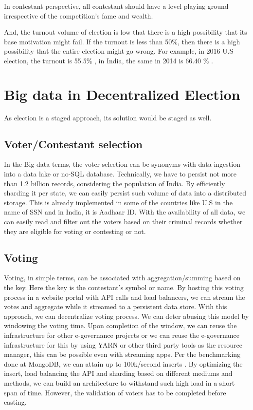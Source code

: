 \documentclass[sigconf]{acmart}
\begin{document}
In contestant perspective, all contestant should have a level playing ground irrespective of the competition's fame and wealth.

And, the turnout volume of election is low that there is a high possibility that its base motivation might fail. If the turnout is less than 50\%, then there is a high possibility that the entire election might go wrong. For example, in 2016 U.S election, the turnout is 55.5\% \cite{10:article}, in India, the same in 2014 is 66.40 \% \cite{11:online}.



\section{Big data in Decentralized Election}
As election is a staged approach, its solution would be staged as well.

\subsection{Voter/Contestant selection}

In the Big data terms, the voter selection can be synonyms with data ingestion into a data lake or no-SQL database. Technically, we have to persist not more than 1.2 billion records, considering the population of India. By efficiently sharding it per state, we can easily persist such volume of data into a distributed storage. This is already implemented in some of the countries like U.S in the name of SSN \cite{15:online} and in India, it is  Aadhaar ID\cite{13:online}. With the availability of all data, we can easily read and filter out the voters based on their criminal records whether they are eligible for voting or contesting or not.


\subsection{Voting}

Voting, in simple terms, can be associated with aggregation/summing based on the key. Here the key is the contestant's symbol or name. By hosting this voting process in a website portal with API calls and load balancers, we can stream the votes and aggregate while it streamed to a persistent data store. With this approach, we can decentralize voting process. We can deter abusing this model by windowing the voting time. Upon completion of the window, we can reuse the infrastructure for other e-governance projects or we can reuse the e-governance infrastructure for this by using YARN or other third party tools as the resource manager, this can be possible even with streaming apps. 
Per the benchmarking done at MongoDB, we can attain up to 100k/second inserts \cite{14:techreport}. By optimizing the insert, load balancing the API  and sharding based on different mediums and methods, we can build an architecture to withstand such high load in a short span of time. However, the validation of voters has to be completed before casting.
\end{document}
